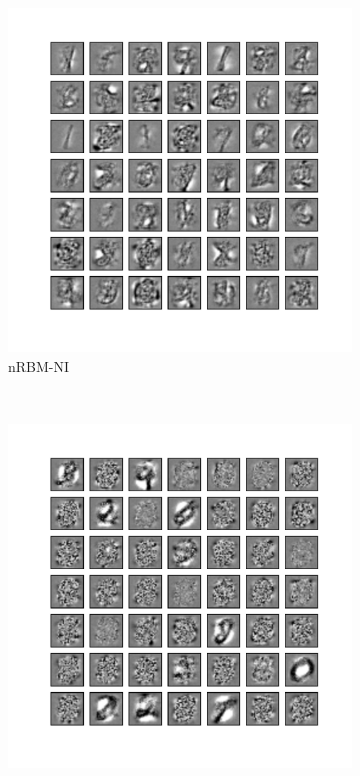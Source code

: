 \begin{figure}
\begin{subfigure}[t]{0.4\textwidth}
		\includegraphics[width=\textwidth]{pics_sdlm/33_MNIST_RBM_noise/2_60000_0.pdf}
		\caption{nRBM-NI}
	\end{subfigure}\\
	\begin{subfigure}[t]{0.4\textwidth}
		\includegraphics[width=\textwidth]{pics_sdlm/50_MNIST_SRBM_original/2_60000_0.pdf}

\end{subfigure}
\end{figure}
